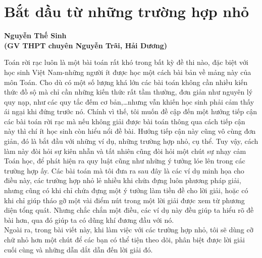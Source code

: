 \section{Bắt dầu từ những trường hợp nhỏ}
\begin{center}
	\textbf{\color{violet}
		{Nguyễn Thế Sinh\\
			(GV THPT chuyên Nguyễn Trãi, Hải Dương)}}
\end{center}
Toán rời rạc luôn là một bài toán rất khó trong bất kỳ đề thi nào, đặc biệt với học sinh Việt Nam-những người ít được học một cách bài bản về mảng này của môn Toán. Cho dù có một số lượng khá lớn các bài toán không cần nhiều kiến thức đồ sộ mà chỉ cần những kiến thức rất tầm thường, đơn giản như nguyên lý quy nạp, như các quy tắc đếm cơ bản,\ldots nhưng vẫn khiến học sinh phải cảm thấy ái ngại khi đứng trước nó. Chính vì thế, tôi muốn đề cập đến một hướng tiếp cận các bài toán rời rạc mà nếu không giải được bài toán thông qua cách tiếp cận này thì chí ít học sinh còn hiểu nổi đề bài. Hướng tiếp cận này cũng vô cùng đơn giản, đó là bắt đầu với những ví dụ, những trường hợp nhỏ, cụ thể. Tuy vậy, cách làm này đòi hỏi sự kiên nhẫn và tất nhiên cũng đòi hỏi một chút sự nhạy cảm Toán học, để phát hiện ra quy luật cũng như những ý tưởng lóe lên trong các trường hợp ấy. Các bài toán mà tôi đưa ra sau đây là các ví dụ minh họa cho điều này, các trường hợp nhỏ lẻ nhiều khi chứa đựng luôn phương pháp giải, nhưng cũng có khi chỉ chứa đựng một ý tưởng làm tiền đề cho lời giải, hoặc có khi chỉ giúp tháo gỡ một vài điểm nút trong một lời giải được xem từ phương diện tổng quát. Nhưng chắc chắn một điều, các ví dụ này đều giúp ta hiểu rõ đề bài hơn, qua đó giúp ta có dũng khí đương đầu với nó.\\
Ngoài ra, trong bài viết này, khi làm việc với các trường hợp nhỏ, tôi sẽ dùng cỡ chữ nhỏ hơn một chút để các bạn có thể tiện theo dõi, phân biệt được lời giải cuối cùng và những dẫn dắt dẫn đến lời giải đó. 
\setcounter{bt}{0}

